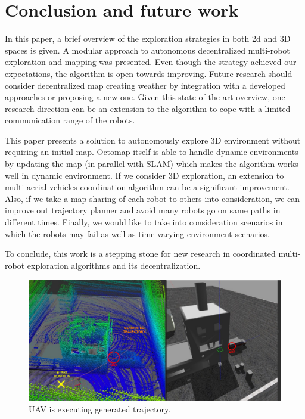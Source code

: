 \section{Conclusion and future work} \label{sec:conclusion}

In this paper, a brief overview of the exploration strategies in both 2d and 3D spaces is given. A modular approach to autonomous decentralized multi-robot exploration and mapping was presented. Even though the strategy achieved our expectations, the algorithm is open towards improving. Future research should consider decentralized map creating weather by integration with a developed approaches or proposing a new one. Given this state-of-the art overview, one research direction can be an extension to the algorithm to cope with a limited communication range of the robots.

This paper presents a solution to autonomously explore 3D environment without requiring an initial map. Octomap itself is able to handle dynamic environments by updating the map (in parallel with SLAM) which makes the algorithm works well in dynamic environment.
If we consider 3D exploration, an extension to multi aerial vehicles coordination algorithm can be a significant improvement. Also, if we take a map sharing of each robot to others into consideration, we can improve out trajectory planner and avoid many robots go on same paths in different times. Finally, we would like to take into consideration scenarios in which the robots may fail as well as time-varying environment scenarios.

To conclude, this work is a stepping stone for new research in coordinated multi-robot exploration algorithms and its decentralization.

\begin{figure}[t]
	\centering
	\includegraphics[width=1.0\columnwidth]{./pictures/rviz_gazebo.pdf}	
	\caption{UAV is executing generated trajectory.}
	\label{fig:rviz_gazebo}
\end{figure}